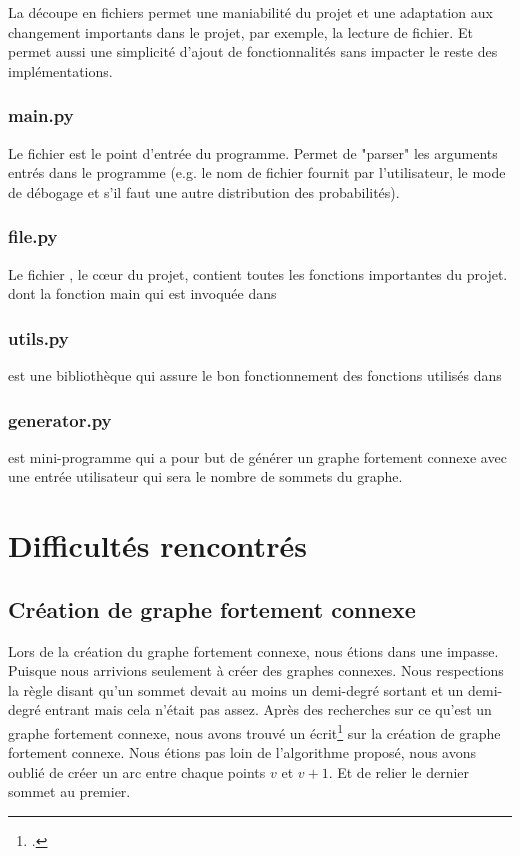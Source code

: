 \documentclass[a4paper, 11pt, oneside]{article}
\begin{document}
	La découpe en fichiers permet une maniabilité du projet et une adaptation aux changement importants dans le projet, par exemple, la lecture de fichier. Et permet aussi une simplicité d'ajout de fonctionnalités sans impacter le reste des implémentations.
		\subsubsection{main.py}
		Le fichier  est le point d'entrée du programme. Permet de "parser" les arguments entrés dans le programme (e.g. le nom de fichier fournit par l'utilisateur, le mode de débogage et s'il faut une autre distribution des probabilités).
		
		\subsubsection{file.py}
		Le fichier , le cœur du projet, contient toutes les fonctions importantes du projet. dont la fonction main qui est invoquée dans 
		
		\subsubsection{utils.py}
		 est une bibliothèque qui assure le bon fonctionnement des fonctions utilisés dans 
		
		\subsubsection{generator.py}
		 est mini-programme qui a pour but de générer un graphe fortement connexe avec une entrée utilisateur qui sera le nombre de sommets du graphe.
		
	\section{Difficultés rencontrés}
		\subsection{Création de graphe fortement connexe}
			Lors de la création du graphe fortement connexe, nous étions dans une impasse. Puisque nous arrivions seulement à créer des graphes connexes. Nous respections la règle disant qu'un sommet devait au moins un demi-degré sortant et un demi-degré entrant mais cela n'était pas assez. Après des recherches sur ce qu'est un graphe fortement connexe, nous avons trouvé un écrit\footcite{ma} sur la création de graphe fortement connexe. Nous étions pas loin de l'algorithme proposé, nous avons oublié de créer un arc entre chaque points $v$ et $v+1$. Et de relier le dernier sommet au premier.
			
\end{document}
